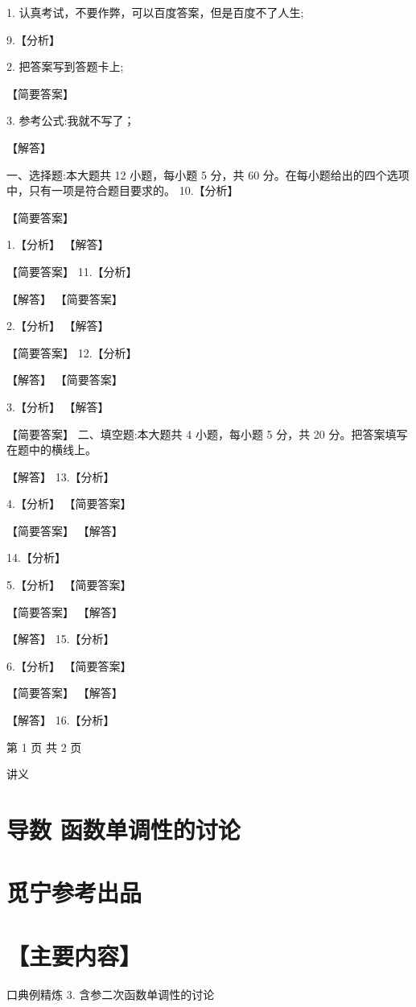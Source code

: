 \documentclass[10pt]{article}
\begin{document}
1. 认真考试，不要作弊，可以百度答案，但是百度不了人生;

9.【分析】

2. 把答案写到答题卡上;

【简要答案】

3. 参考公式:我就不写了；

【解答】

一、选择题:本大题共 12 小题，每小题 5 分，共 60 分。在每小题给出的四个选项中，只有一项是符合题目要求的。 10.【分析】

【简要答案】

1.【分析】 【解答】

【简要答案】 11.【分析】

【解答】 【简要答案】

2.【分析】 【解答】

【简要答案】 12.【分析】

【解答】 【简要答案】

3.【分析】 【解答】

【简要答案】 二、填空题:本大题共 4 小题，每小题 5 分，共 20 分。把答案填写在题中的横线上。

【解答】 13.【分析】

4.【分析】 【简要答案】

【简要答案】 【解答】

14.【分析】

5.【分析】 【简要答案】

【简要答案】 【解答】

【解答】 15.【分析】

6.【分析】 【简要答案】

【简要答案】 【解答】

【解答】 16.【分析】

第 1 页 共 2 页

讲义

\section*{导数 函数单调性的讨论}

\section*{觅宁参考出品}

\section*{【主要内容】}

口典例精炼 3. 含参二次函数单调性的讨论
\end{document}
